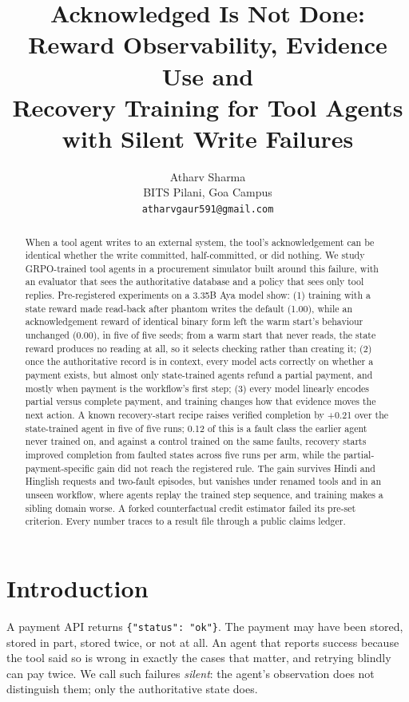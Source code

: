 \documentclass[11pt]{article}
\title{Acknowledged Is Not Done: Reward Observability, Evidence Use and\\Recovery Training for Tool Agents with Silent Write Failures}
\author{Atharv Sharma \\
  BITS Pilani, Goa Campus \\
  \texttt{atharvgaur591@gmail.com}}
\begin{document}
\maketitle

\begin{abstract}
When a tool agent writes to an external system, the tool's acknowledgement can be identical whether the write committed, half-committed, or did nothing. We study GRPO-trained tool agents in a procurement simulator built around this failure, with an evaluator that sees the authoritative database and a policy that sees only tool replies. Pre-registered experiments on a 3.35B Aya model show: (1) training with a state reward made read-back after phantom writes the default (1.00), while an acknowledgement reward of identical binary form left the warm start's behaviour unchanged (0.00), in five of five seeds; from a warm start that never reads, the state reward produces no reading at all, so it selects checking rather than creating it; (2) once the authoritative record is in context, every model acts correctly on whether a payment exists, but almost only state-trained agents refund a partial payment, and mostly when payment is the workflow's first step; (3) every model linearly encodes partial versus complete payment, and training changes how that evidence moves the next action. A known recovery-start recipe raises verified completion by +0.21 over the state-trained agent in five of five runs; 0.12 of this is a fault class the earlier agent never trained on, and against a control trained on the same faults, recovery starts improved completion from faulted states across five runs per arm, while the partial-payment-specific gain did not reach the registered rule. The gain survives Hindi and Hinglish requests and two-fault episodes, but vanishes under renamed tools and in an unseen workflow, where agents replay the trained step sequence, and training makes a sibling domain worse. A forked counterfactual credit estimator failed its pre-set criterion. Every number traces to a result file through a public claims ledger.
\end{abstract}

\section{Introduction}

A payment API returns \texttt{\{"status": "ok"\}}. The payment may have been stored, stored in part, stored twice, or not at all. An agent that reports success because the tool said so is wrong in exactly the cases that matter, and retrying blindly can pay twice. We call such failures \emph{silent}: the agent's observation does not distinguish them; only the authoritative state does.
\end{document}
